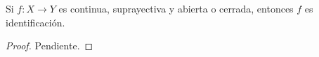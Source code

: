 

\begin{proposition}
Si $f : X \longrightarrow Y$ es continua, suprayectiva y abierta o cerrada, entonces $f$ es identificación.
\end{proposition}

\begin{proof}
Pendiente.
\end{proof}
